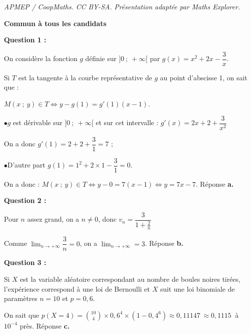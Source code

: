 \documentclass[10pt]{article}
\providecommand{\starredbullet}{\ensuremath{\bullet}}
\providecommand{\np}[2][]{{#2~#1}}
\begin{document}
\noindent\textit{APMEP / CoopMaths. CC BY-SA. Présentation adaptée par Maths Explorer.}\par\medskip
\textbf{Commun à tous les candidats}

\medskip














\textbf{Question 1 :}

On considère la fonction $g$ définie sur $]0~;~+\infty[$  par $g(x)= x^2+ 2x - \dfrac{3}{x}$.







Si $T$ est la tangente à la courbe représentative de $g$ au point d'abscisse 1, on sait que :

$M(x~;~y) \in T \iff y - g(1) = g'(1)(x - 1)$.

\starredbullet $g$ est dérivable sur $]0~;~+\infty[$ et sur cet intervalle : $g'(x) = 2x + 2 + \dfrac{3}{x^2}$

On a donc $g'(1) = 2 + 2 + \dfrac{3}{1} = 7$ ;

\starredbullet D'autre part $g(1) = 1^2 + 2 \times 1 - \dfrac{3}{1} = 0$.

On a donc : $M(x~;~y) \in T \iff y - 0 = 7(x - 1) \iff y = 7x - 7$. Réponse \textbf{a.}

\medskip

\textbf{Question 2 :}









Pour $n$ assez grand, on a $n \ne 0$, donc $v_n = \dfrac{3}{1 + \frac{2}{n}}$

Comme $\displaystyle\lim_{n \to + \infty} \dfrac{3}{n} = 0$, on a $\displaystyle\lim_{n \to + \infty} = 3$. Réponse \textbf{b.}

\medskip

\textbf{Question 3 :}








Si $X$ est la variable aléatoire correspondant au nombre de boules noires tirées, l'expérience correspond à une loi de Bernoulli  et $X$ suit une loi binomiale de paramètres $n = 10$ et $p = 0,6$.

On sait que $p(X = 4) = \binom{10}{4} \times 0,6^4 \times \left(1 - 0,4^6\right) \approx \np{0,11147} \approx \np{0,1115}$ à $10^{-4}$ près. Réponse \textbf{c.~~}
\medskip
\end{document}
